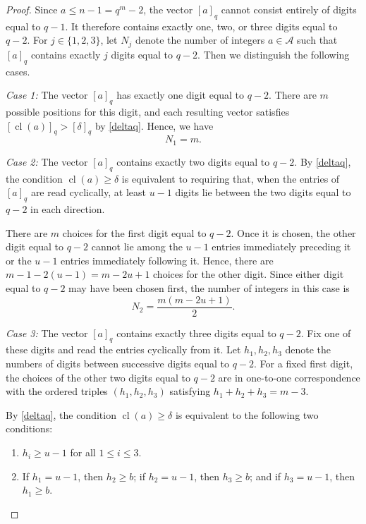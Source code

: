 \documentclass[journal,onecolumn]{IEEEtran}
\newcommand{\cl}{\operatorname{cl}}
\begin{document}
\begin{proof}
Since $a\leq n-1=q^m-2$, the vector $[a]_q$ cannot consist entirely of
digits equal to $q-1$. It therefore contains exactly one, two, or three
digits equal to $q-2$. For $j\in\{1,2,3\}$, let $N_j$ denote the number
of integers $a\in\mathcal{A}$ such that  $[a]_q$ contains exactly $j$
digits equal to $q-2$. Then we distinguish the following cases.

\emph{Case 1:} The vector $[a]_q$ has exactly one digit equal to $q-2$.
 There are $m$ possible positions for this digit, and each resulting vector satisfies
$[\cl(a)]_q>[\delta]_q$ by \eqref{deltaq}. Hence, we have
\begin{equation*}
    N_1=m.
\end{equation*}

\emph{Case 2:} The vector $[a]_q$ contains exactly two digits equal to
$q-2$. By \eqref{deltaq}, the condition $\cl(a)\geq\delta$ is
equivalent to requiring that, when the entries of $[a]_q$ are read
cyclically, at least $u-1$ digits lie between the two digits equal to
$q-2$ in each direction.

There are $m$ choices for the first digit equal to $q-2$. Once it is
chosen, the other digit equal to $q-2$ cannot lie among the $u-1$
entries immediately preceding it or the $u-1$ entries immediately
following it. Hence, there are $m-1-2(u-1)=m-2u+1$ choices for the
other digit. 
Since either digit equal to $q-2$ may have been chosen first, the
number of integers in this case is
\begin{equation*}
N_2=\frac{m(m-2u+1)}{2}.
\end{equation*}
 
\emph{Case 3:}  The vector $[a]_q$ contains exactly three digits equal to
$q-2$. Fix one of these digits and read the entries cyclically from it.
Let  $h_1,h_2,h_3$
denote the numbers of digits between successive digits equal to
$q-2$.   For a fixed first digit, the choices of the other two digits equal to
$q-2$ are in one-to-one correspondence with the ordered triples $(h_1,h_2,h_3)$  satisfying $h_1+h_2+h_3=m-3$.  

By \eqref{deltaq},
 the condition $\cl(a)\geq\delta$ is equivalent to
the following two conditions:
\begin{enumerate}
\item[(i)]  $h_i\geq u-1$ for all $1\leq i\leq3$.
\item[(ii)] If $h_1=u-1$, then $h_2\geq b$; if $h_2=u-1$, then
$h_3\geq b$; and if $h_3=u-1$, then $h_1\geq b$.
\end{enumerate}



\end{proof}
\end{document}
